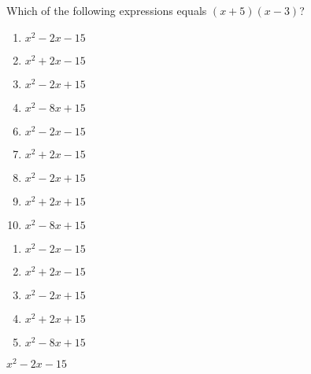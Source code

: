 


  Which of the following expressions equals $(x+5)(x-3)$?


\ifsat
	\begin{enumerate}[label=\Alph*)]
		\item   $x^2-2x-15$%
		\item  $x^2+2x-15$
		\item  $x^2-2x+15$
		\item  $x^2-8x+15$
	\end{enumerate}
\else
\fi

\ifacteven
	\begin{enumerate}[label=\textbf{\Alph*.},itemsep=\fill,align=left]
		\setcounter{enumii}{5}
		\item   $x^2-2x-15$%
		\item  $x^2+2x-15$
		\item  $x^2-2x+15$
		\addtocounter{enumii}{1}
		\item  $x^2+2x+15$
		\item  $x^2-8x+15$
	\end{enumerate}
\else
\fi

\ifactodd
	\begin{enumerate}[label=\textbf{\Alph*.},itemsep=\fill,align=left]
		\item   $x^2-2x-15$%
		\item  $x^2+2x-15$
		\item  $x^2-2x+15$
		\item  $x^2+2x+15$
		\item  $x^2-8x+15$
	\end{enumerate}
\else
\fi

\ifgridin
   $x^2-2x-15$%
		
\else
\fi

